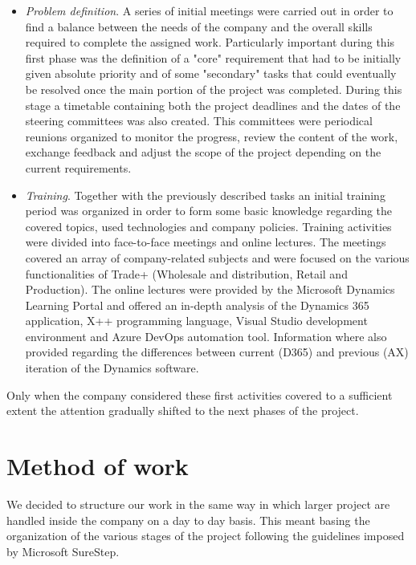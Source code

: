 \begin{itemize}
    \item \textit{Problem definition}. A series of initial meetings were carried out in order to find a balance between the needs of the company and the overall skills required to complete the assigned work. Particularly important during this first phase was the definition of a "core" requirement that had to be initially given absolute priority and of some "secondary" tasks that could eventually be resolved once the main portion of the project was completed. During this stage a timetable containing both the project deadlines and the dates of the steering committees was also created. This committees were periodical reunions organized to monitor the progress, review the content of the work, exchange feedback and adjust the scope of the project depending on the current requirements.
    
    \item \textit{Training}. Together with the previously described tasks an initial training period was organized in order to form some basic knowledge regarding the covered topics, used technologies and company policies. Training activities were divided into face-to-face meetings and online lectures. The meetings covered an array of company-related subjects and were focused on the various functionalities of Trade+ (Wholesale and distribution, Retail and Production). The online lectures were provided by the Microsoft Dynamics Learning Portal and offered an in-depth analysis of the Dynamics 365 application, X++ programming language, Visual Studio development environment and Azure DevOps automation tool. Information where also provided regarding the differences between current (D365) and previous (AX) iteration of the Dynamics software.
\end{itemize}

Only when the company considered these first activities covered to a sufficient extent the attention gradually shifted to the next phases of the project.

\section{Method of work}

We decided to structure our work in the same way in which larger project are handled inside the company on a day to day basis. This meant basing the organization of the various stages of the project following the guidelines imposed by Microsoft SureStep.

